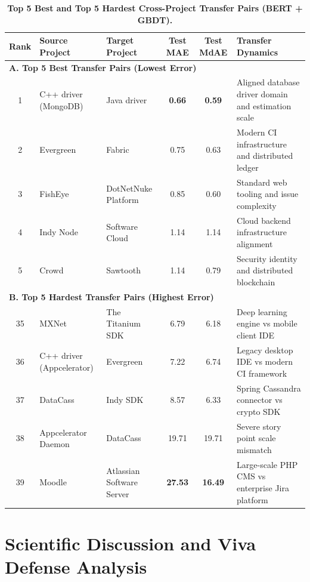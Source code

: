 \documentclass[11pt,a4paper]{article}
\begin{document}
\begin{table}[H]
\centering
\small
\caption{\textbf{Top 5 Best and Top 5 Hardest Cross-Project Transfer Pairs (BERT + GBDT).}}
\label{tab:pairs}
\begin{tabularx}{\linewidth}{@{} c l l c c X @{}}
\toprule
\textbf{Rank} & \textbf{Source Project} & \textbf{Target Project} & \textbf{Test MAE} & \textbf{Test MdAE} & \textbf{Transfer Dynamics} \\
\midrule
\multicolumn{6}{l}{\textbf{\color{primarynavy}A. Top 5 Best Transfer Pairs (Lowest Error)}} \\
\midrule
1 & C++ driver (MongoDB) & Java driver & \textbf{0.66} & \textbf{0.59} & Aligned database driver domain and estimation scale \\
2 & Evergreen & Fabric & 0.75 & 0.63 & Modern CI infrastructure and distributed ledger \\
3 & FishEye & DotNetNuke Platform & 0.85 & 0.60 & Standard web tooling and issue complexity \\
4 & Indy Node & Software Cloud & 1.14 & 1.14 & Cloud backend infrastructure alignment \\
5 & Crowd & Sawtooth & 1.14 & 0.79 & Security identity and distributed blockchain \\
\midrule
\multicolumn{6}{l}{\textbf{\color{darkred}B. Top 5 Hardest Transfer Pairs (Highest Error)}} \\
\midrule
35 & MXNet & The Titanium SDK & 6.79 & 6.18 & Deep learning engine vs mobile client IDE \\
36 & C++ driver (Appcelerator) & Evergreen & 7.22 & 6.74 & Legacy desktop IDE vs modern CI framework \\
37 & DataCass & Indy SDK & 8.57 & 6.33 & Spring Cassandra connector vs crypto SDK \\
38 & Appcelerator Daemon & DataCass & 19.71 & 19.71 & Severe story point scale mismatch \\
39 & Moodle & Atlassian Software Server & \textbf{27.53} & \textbf{16.49} & Large-scale PHP CMS vs enterprise Jira platform \\
\bottomrule
\end{tabularx}
\end{table}

\section{Scientific Discussion and Viva Defense Analysis}
\label{sec:discussion}
\end{document}
